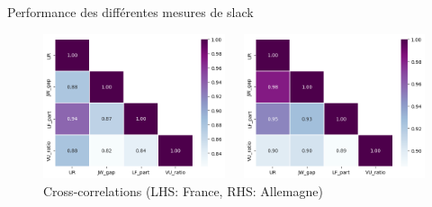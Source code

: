 \documentclass[9pt, xcolor={dvipsnames}]{beamer}
\begin{document}
\begin{frame}[label=slack]{Performance des différentes mesures de slack}
  \begin{figure}
   \begin{columns}[c]
    \begin{column}{0.5\textwidth}
      \centering
      \includegraphics[width=1\textwidth]{img/franceHM.png}
    \end{column}
    \begin{column}{0.5\textwidth}
      \centering
      \includegraphics[width=1\textwidth]{img/germanyHM.png}
    \end{column}
    \end{columns}
    \caption{Cross-correlations (LHS: France, RHS: Allemagne)}
  \end{figure}
  \end{frame}
\end{document}
